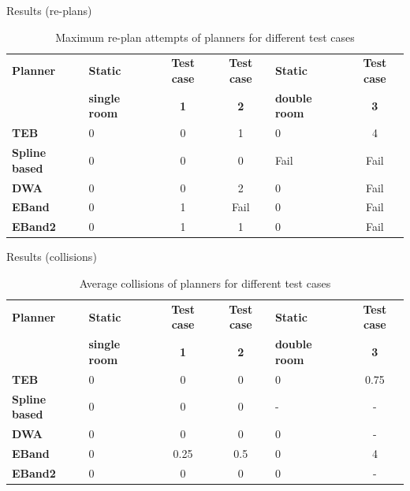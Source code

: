 \documentclass{beamer}
\begin{document}
\begin{frame}[t]{\huge{Results (re-plans)}}
\begin{table}[H]
    \centering
    \begin{tabular}{p{1.5cm}p{1cm}ccp{1cm}c}\toprule
        \textbf{Planner} & \textbf{Static} & \textbf{Test case} & \textbf{Test case} & \textbf{Static} & \textbf{Test case} \\
                         & \textbf{single room} & \textbf{1} & \textbf{2} & \textbf{double room}       & \textbf{3} \\\toprule
        \textbf{TEB         } & 0 & 0 & 1 & 0 & 4 \\\midrule
        \textbf{Spline based} & 0 & 0 & 0 & Fail & Fail \\\midrule
        \textbf{DWA         } & 0 & 0 & 2 & 0 & Fail \\\midrule
        \textbf{EBand       } & 0 & 1 & Fail & 0 & Fail \\\midrule
        \textbf{EBand2      } & 0 & 1 & 1 & 0 & Fail \\
        \bottomrule
    \end{tabular}
    \caption{Maximum re-plan attempts of planners for different test cases}\label{tab:max_re-plan_planner_comp}
\end{table}
\end{frame}

\begin{frame}[t]{\huge{Results (collisions)}}
\begin{table}[H]
    \centering
    \begin{tabular}{p{1.5cm}p{1cm}ccp{1cm}c}\toprule
        \textbf{Planner} & \textbf{Static} & \textbf{Test case} & \textbf{Test case} & \textbf{Static} & \textbf{Test case} \\
                         & \textbf{single room} & \textbf{1} & \textbf{2} & \textbf{double room}       & \textbf{3} \\\toprule
        \textbf{TEB         } & 0 & 0 & 0 & 0 & 0.75 \\\midrule
        \textbf{Spline based} & 0 & 0 & 0 & \-- & \-- \\\midrule
        \textbf{DWA         } & 0 & 0 & 0 & 0 & \-- \\\midrule
        \textbf{EBand       } & 0 & 0.25 & 0.5 & 0 & 4 \\\midrule
        \textbf{EBand2      } & 0 & 0 & 0 & 0 & \-- \\
        \bottomrule
    \end{tabular}
    \caption{Average collisions of planners for different test cases}\label{tab:avg_collisions_planner_comp}
\end{table}
\end{frame}
\end{document}

